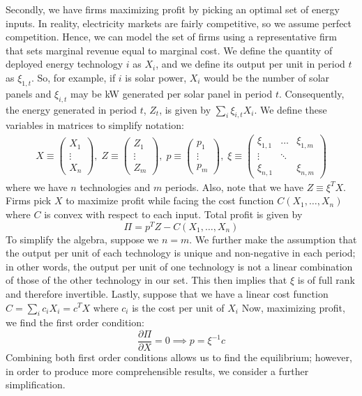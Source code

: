 \documentclass[12pt,a4paper]{extarticle}
\begin{document}
Secondly, we have firms maximizing profit by picking an optimal set of energy inputs. In reality, electricity markets are fairly competitive, so we assume perfect competition. Hence, we can model the set of firms using a representative firm that sets marginal revenue equal to marginal cost. We define the quantity of deployed energy technology $i$ as $X_i$, and we define its output per unit in period $t$ as $\xi_{1,t}$. So, for example, if $i$ is solar power, $X_i$ would be the number of solar panels and $\xi_{i,t}$ may be kW generated per solar panel in period $t$. Consequently, the energy generated in period $t$, $Z_t$, is given by $\sum_i \xi_{i,t} X_i$. We define these variables in matrices to simplify notation:
\begin{align*}
X \equiv \begin{pmatrix}
X_1\\
\vdots\\
X_n
\end{pmatrix} ,\;
Z \equiv \begin{pmatrix}
Z_1\\
\vdots\\
Z_m
\end{pmatrix} ,\;
p \equiv \begin{pmatrix}
p_1\\
\vdots\\
p_m
\end{pmatrix} ,\;
\xi \equiv \begin{pmatrix}
\xi_{1,1} & \dots & \xi_{1,m}\\
\vdots & \ddots & \\
\xi_{n,1} &  & \xi_{n,m}
\end{pmatrix} 
\end{align*}
where we have $n$ technologies and  $m$ periods. Also, note that we have $Z \equiv \xi^T X$. Firms pick $X$ to maximize profit while facing the cost function $C(X_1, \dots, X_n)$ where $C$ is convex with respect to each input. Total profit is given by 
\begin{equation}
\Pi = p^T Z - C(X_1, \dots, X_n)
\end{equation}
To simplify the algebra, suppose we $n=m$. We further make the assumption that the output per unit of each technology is unique and non-negative in each period; in other words, the output per unit of one technology is not a linear combination of those of the other technology in our set. This then implies that $\xi$ is of full rank and therefore invertible. Lastly, suppose that we have a linear cost function $C = \sum_i c_i X_i = c^T X$ where $c_i$ is the cost per unit of $X_i$ Now, maximizing profit, we find the first order condition:
\begin{equation}
\frac{\partial \Pi}{\partial X} = 0 \implies p = \xi^{-1} c
\end{equation}
Combining both first order conditions allows us to find the equilibrium; however, in order to produce more comprehensible results, we consider a further simplification. 
\end{document}
